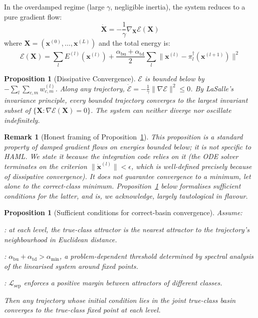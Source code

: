 \documentclass[11pt,a4paper]{article}
\newtheorem{proposition}[theorem]{Proposition}
\newtheorem{remark}[theorem]{Remark}
\begin{document}
In the overdamped regime (large $\gamma$, negligible inertia), the system reduces to a pure
gradient flow:
\begin{equation}
  \dot{\mathbf{X}} = -\frac{1}{\gamma}\nabla_{\mathbf{X}} \mathcal{E}(\mathbf{X})
\end{equation}
where $\mathbf{X} = (\mathbf{x}^{(0)}, \ldots, \mathbf{x}^{(L)})$ and the total energy is:
\begin{equation}
  \mathcal{E}(\mathbf{X}) = \sum_l E^{(l)}(\mathbf{x}^{(l)})
  + \frac{\alpha_{\mathrm{bu}} + \alpha_{\mathrm{td}}}{2}
    \sum_l \|\mathbf{x}^{(l)} - \pi_l^\dagger(\mathbf{x}^{(l+1)})\|^2
\label{eq:lyapunov}
\end{equation}

\begin{proposition}[Dissipative Convergence]
\label{prop:convergence}
$\mathcal{E}$ is bounded below by $-\sum_l \sum_{c,m} w^{(l)}_{c,m}$. Along any trajectory,
$\dot{\mathcal{E}} = -\frac{1}{\gamma}\|\nabla \mathcal{E}\|^2 \le 0$.
By LaSalle's invariance principle, every bounded trajectory converges to the largest
invariant subset of $\{\mathbf{X} : \nabla \mathcal{E}(\mathbf{X}) = 0\}$. The system can
neither diverge nor oscillate indefinitely.
\end{proposition}

\begin{remark}[Honest framing of Proposition~\ref{prop:convergence}]
This proposition is a standard property of damped gradient flows on energies bounded
below; it is not specific to HAML. We state it because the integration code relies on
it (the ODE solver terminates on the criterion $\|\dot{\mathbf{x}}^{(l)}\| < \epsilon$,
which is well-defined precisely because of dissipative convergence). It does
\emph{not} guarantee convergence to a minimum, let alone to the correct-class minimum.
Proposition~\ref{prop:correct_basin} below formalises sufficient conditions for the
latter, and is, we acknowledge, largely tautological in flavour.
\end{remark}

\begin{proposition}[Sufficient conditions for correct-basin convergence]
\label{prop:correct_basin}
Assume:
\begin{description}[leftmargin=2.5em]
  \item[C1 -- Local dominance]: at each level, the true-class attractor is the nearest
        attractor to the trajectory's neighbourhood in Euclidean distance.
  \item[C2 -- Sufficient coupling]:
        $\alpha_{\mathrm{bu}} + \alpha_{\mathrm{td}} > \alpha_{\min}$,
        a problem-dependent threshold determined by spectral analysis of the linearised
        system around fixed points.
  \item[C3 -- Basin separation]: $\mathcal{L}_{\mathrm{sep}}$ enforces a positive margin
        between attractors of different classes.
\end{description}
Then any trajectory whose initial condition lies in the joint true-class basin converges
to the true-class fixed point at each level.
\end{proposition}
\end{document}
